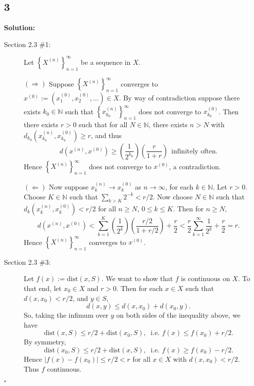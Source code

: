 \documentclass[12pt]{article}
\newcounter{ProofCounter}
\newenvironment{Solution}{\stepcounter{ProofCounter}\textbf{Solution:}}{\hfill$\square$}
\begin{document}
\subsection*{3}
\begin{Solution}
  \begin{description}
    \item[Section 2.3 \#1:] Let $\left\{ X^{(n)} \right\}_{n=1}^{\infty}$ be a sequence in $X$.

      $(\Rightarrow)$ Suppose $\left\{ X^{(n)} \right\}_{n=1}^{\infty}$ converges to $x^{(0)} := (x_1^{(0)}, x_2^{(0)}, \dots) \in X$. By way of
      contradiction suppose there exists $k_0 \in \mathbb{N}$ such that $\left\{ x_{k_0}^{(n)} \right\}_{n=1}^{\infty}$ does not converge to
      $x_{k_0}^{(0)}$. Then there exists $r > 0$ such that for all $N \in \mathbb{N}$, there exists $n > N$ with $d_{k_0}(x_{k_0}^{(n)},
      x_{k_0}^{(0)}) \geq r$, and thus 
      \[
        d(x^{(n)}, x^{(0)}) \geq \left( \frac{1}{2^{k_0}} \right)\left( \frac{r}{1 + r} \right) \ \ \text{infinitely often.}
      \]
      Hence $\left\{ X^{(n)} \right\}_{n=1}^{\infty}$ does not converge to $x^{(0)}$, a contradiction.

      $(\Leftarrow)$ Now suppose $x_k^{(n)} \rightarrow x_k^{(0)}$ as $n \rightarrow \infty$, for each $k \in \mathbb{N}$. Let $r > 0$. Choose $K \in
      \mathbb{N}$ such that $\sum_{k > K}2^{-k} < r / 2$. Now choose $N \in \mathbb{N}$ such that $d_k(x_k^{(n)}, x_k^{(0)}) < r/2$ for all $n \geq
      N$, $0 \leq k \leq K$. Then for $n \geq N$,
      \[
        d(x^{(n)}, x^{(0)}) < \sum_{k=1}^{K}\left( \frac{1}{2^k} \right)\left( \frac{r/2}{1 + r/2} \right) + \frac{r}{2} <
        \frac{r}{2}\sum_{k=1}^{\infty}\frac{1}{2^k} + \frac{r}{2} = r.
      \]
      Hence $\left\{ X^{(n)} \right\}_{n=1}^{\infty}$ converges to $x^{(0)}$.

    \item[Section 2.3 \#3:] Let $f(x) := \text{dist}(x, S)$. We want to show that $f$ is continuous on $X$. To that end, let $x_0 \in X$ and $r > 0$.
      Then for each $x \in X$ such that $d(x,x_0) < r/2$, and $y \in S$,
      \[
        d(x,y) \leq d(x,x_0) + d(x_0, y).
      \]
      So, taking the infimum over $y$ on both sides of the inequality above, we have 
      \[
        \text{dist}(x, S) \leq r/2 + \text{dist}(x_0, S), \ \text{ i.e. } f(x) \leq f(x_0) + r/2.
      \]
      By symmetry,
      \[
        \text{dist}(x_0, S) \leq r/2 + \text{dist}(x, S), \ \text{ i.e. } f(x) \geq f(x_0) - r/2.
      \]
      Hence $|f(x) - f(x_0)| \leq r / 2 < r$ for all $x \in X$ with $d(x,x_0) < r/2$. Thus $f$ continuous.
        
  \end{description}
\end{Solution}
\end{document}
